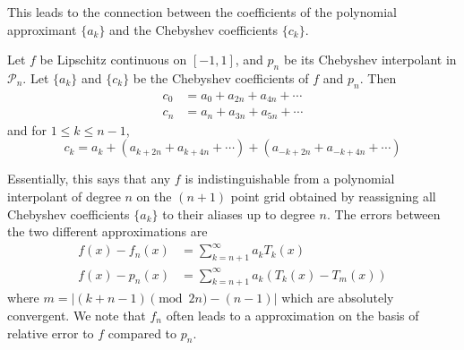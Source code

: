 This leads to the connection between the coefficients of the polynomial approximant $\{a_k\}$ and the Chebyshev coefficients $\{c_k\}$.
\begin{theorem}
	Let $f$ be Lipschitz continuous on $[-1, 1]$, and $p_n$ be its Chebyshev interpolant in $\mathcal{P}_n$. Let $\{a_k\}$ and $\{c_k\}$ be the Chebyshev coefficients of $f$ and $p_n$. Then
	\begin{align*}
		c_0 & = a_0 + a_{2n} + a_{4n} + \cdots \\
		c_n & = a_n + a_{3n} + a_{5n} + \cdots
	\end{align*}
	and for $1 \leq k \leq n - 1$,
  \begin{displaymath}
    c_k = a_k + (a_{k+2n} + a_{k+4n} + \cdots) + (a_{-k+2n} + a_{-k+4n}+\cdots)
  \end{displaymath}
\end{theorem}
Essentially, this says that any $f$ is indistinguishable from a polynomial interpolant of degree $n$ on the $(n+1)$ point grid obtained by reassigning all Chebyshev coefficients $\{a_k\}$ to their aliases up to degree $n$. The errors between the two different approximations are 
\begin{align*}
  f(x) - f_n(x) &= \displaystyle\sum_{k=n+1}^{\infty} a_kT_k(x) \\
  f(x) - p_n(x) &= \displaystyle\sum_{k=n+1}^{\infty}a_k(T_k(x) - T_m(x))
\end{align*}
where $m = |(k+n-1)\pmod{2n} - (n-1)|$ which are absolutely convergent. We note that $f_n$ often leads to a approximation on the basis of relative error to $f$ compared to $p_n$.

